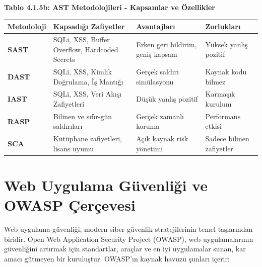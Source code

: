 \begin{center}
\textbf{Tablo 4.1.5b: AST Metodolojileri - Kapsamlar ve Özellikler}

\begin{tabularx}{0.95\textwidth}{|>{\raggedright\arraybackslash}X|>{\raggedright\arraybackslash}X|>{\raggedright\arraybackslash}X|>{\raggedright\arraybackslash}X|}
\hline
\textbf{Metodoloji} & \textbf{Kapsadığı Zafiyetler} & \textbf{Avantajları} & \textbf{Zorlukları} \\
\hline
\textbf{SAST} & SQLi, XSS, Buffer Overflow, Hardcoded Secrets & Erken geri bildirim, geniş kapsam & Yüksek yanlış pozitif \\
\hline
\textbf{DAST} & SQLi, XSS, Kimlik Doğrulama, İş Mantığı & Gerçek saldırı simülasyonu & Kaynak kodu bilmez \\
\hline
\textbf{IAST} & SQLi, XSS, Veri Akışı Zafiyetleri & Düşük yanlış pozitif & Karmaşık kurulum \\
\hline
\textbf{RASP} & Bilinen ve sıfır-gün saldırıları & Gerçek zamanlı koruma & Performans etkisi \\
\hline
\textbf{SCA} & Kütüphane zafiyetleri, lisans uyumu & Açık kaynak risk yönetimi & Sadece bilinen zafiyetler \\
\hline
\end{tabularx}
\end{center}

\section{Web Uygulama Güvenliği ve OWASP Çerçevesi}

Web uygulama güvenliği, modern siber güvenlik stratejilerinin temel taşlarından biridir. Open Web Application Security Project (OWASP), web uygulamalarının güvenliğini artırmak için standartlar, araçlar ve en iyi uygulamalar sunan, kar amacı gütmeyen bir kuruluştur. OWASP'ın kaynak havuzu şunları içerir:


